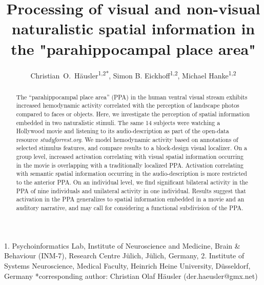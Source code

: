 \documentclass[english]{article}
\begin{document}




\title{Processing of visual and non-visual naturalistic spatial information in
  the "parahippocampal place area"}

\author{
    Christian~O.~Häusler\textsuperscript{1,2{*}},
    Simon B. Eickhoff\textsuperscript{1,2},
    Michael Hanke\textsuperscript{1,2}}

\maketitle
\thispagestyle{fancy}

1. Psychoinformatics Lab, Institute of Neuroscience and Medicine, Brain \&
Behaviour (INM-7), Research Centre Jülich, Jülich, Germany, 2. Institute of
Systems Neuroscience, Medical Faculty, Heinrich Heine University,  Düsseldorf,
Germany {*}corresponding author: Christian Olaf Häusler (der.haeusler@gmx.net)


\begin{abstract}
The ``parahippocampal place area'' (PPA) in the human ventral visual stream
exhibits increased hemodynamic activity correlated with the perception of
landscape photos compared to faces or objects.
Here, we investigate the perception of spatial information embedded in two
naturalistic stimuli.
%
The same 14 subjects were watching a Hollywood movie and listening to its audio-description as part of the open-data resource \textit{studyforrest.org}.
We model hemodynamic activity based on annotations of selected stimulus
features,
and compare results to a block-design visual localizer.
On a group level, increased activation correlating with visual spatial information
occurring in the movie is overlapping with a traditionally localized PPA.
Activation correlating with semantic spatial information occurring in the
audio-description is more restricted to the anterior PPA.
On an individual level, we find significant bilateral activity in the PPA
of nine individuals and unilateral activity in one individual.
Results suggest that activation in the PPA generalizes to spatial information
embedded in a movie and an auditory narrative, and may
call for considering a functional subdivision of the PPA.  \end{abstract}
\end{document}
